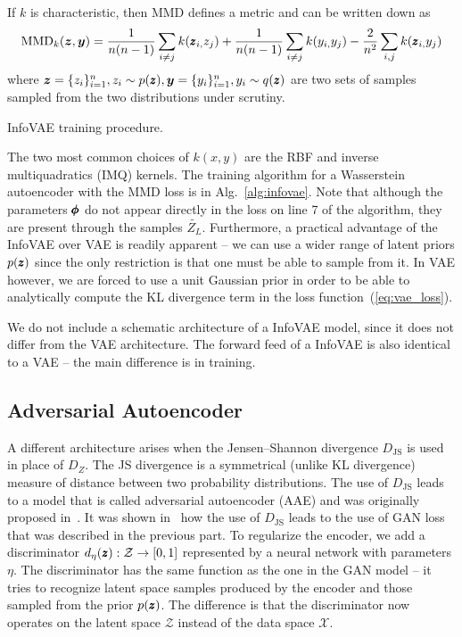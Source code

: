 If $k$ is characteristic, then MMD defines a metric and can be written
down as 
\begin{equation}
\text{MMD}_{k}(\boldsymbol{z},\boldsymbol{y})=\frac{1}{n(n-1)}\sum_{i\neq j}k(\pmb{{z}}_{i,}z_{j})+\frac{1}{n(n-1)}\sum_{i\neq j}k(y_{i,}y_{j})-\frac{2}{n^{2}}\sum_{i,j}k(\pmb{{z}}_{i,}y_{j})\label{eq:mmd}
\end{equation}
where $\boldsymbol{z}=\{z_{i}\}_{i=1}^{n},z_{i}\sim p(\pmb{{z}}),\boldsymbol{y}=\{y_{i}\}_{i=1}^{n},y_{i}\sim q(\pmb{{z}})$
are two sets of samples sampled from the two distributions under scrutiny.
\begin{algorithm}


\caption{InfoVAE training procedure.}
\label{alg:infovae}
\end{algorithm}

The two most common choices of $k(x,y)$ are the RBF and inverse multiquadratics
(IMQ) kernels. The training algorithm for a Wasserstein autoencoder
with the MMD loss is in Alg.~\ref{alg:infovae}. Note that although
the parameters $\pmb{{\phi}}$ do not appear directly in the loss on line
7 of the algorithm, they are present through the samples $\tilde{Z_{L}}$.
Furthermore, a practical advantage of the InfoVAE over VAE is readily
apparent -- we can use a wider range of latent priors $p(\pmb{{z}})$ since
the only restriction is that one must be able to sample from it. In
VAE however, we are forced to use a unit Gaussian prior in order to
be able to analytically compute the KL divergence term in the loss
function~(\ref{eq:vae_loss}). 

We do not include a schematic architecture of a InfoVAE model, since
it does not differ from the VAE architecture. The forward feed of
a InfoVAE is also identical to a VAE -- the main difference is in
training.

\subsection{Adversarial Autoencoder}

A different architecture arises when the Jensen--Shannon divergence
$D_{\text{JS}}$ is used in place of $D_{Z}$. The JS divergence is
a symmetrical (unlike KL divergence) measure of distance between two
probability distributions. The use of $D_{\text{JS}}$ leads to a
model that is called adversarial autoencoder (AAE) and was originally
proposed in~\cite{makhzani2015adversarial}. It was shown in~\cite{tolstikhin2017wasserstein}
how the use of $D_{\text{JS}}$ leads to the use of GAN loss that
was described in the previous part. To regularize the encoder, we
add a discriminator $d_{\eta}(\vc{z}):\mathcal{Z}\rightarrow\left[0,1\right]$
represented by a neural network with parameters $\eta$. The discriminator
has the same function as the one in the GAN model -- it tries to
recognize latent space samples produced by the encoder and those sampled
from the prior $p(\pmb{{z}})$. The difference is that the discriminator now
operates on the latent space $\mathcal{Z}$ instead of the data space
$\mathcal{X}$. 

